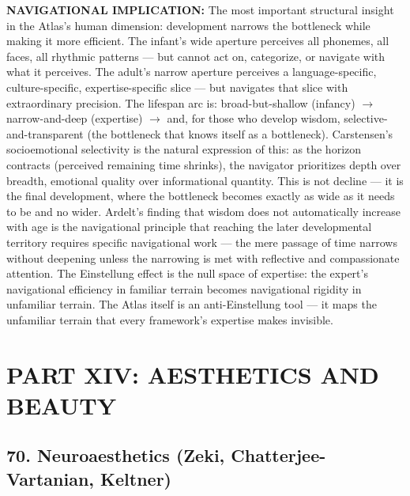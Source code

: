 \textbf{NAVIGATIONAL IMPLICATION:} The most important structural insight in the Atlas's human dimension: development narrows the bottleneck while making it more efficient. The infant's wide aperture perceives all phonemes, all faces, all rhythmic patterns — but cannot act on, categorize, or navigate with what it perceives. The adult's narrow aperture perceives a language-specific, culture-specific, expertise-specific slice — but navigates that slice with extraordinary precision. The lifespan arc is: broad-but-shallow (infancy) $\rightarrow$ narrow-and-deep (expertise) $\rightarrow$ and, for those who develop wisdom, selective-and-transparent (the bottleneck that knows itself as a bottleneck). Carstensen's socioemotional selectivity is the natural expression of this: as the horizon contracts (perceived remaining time shrinks), the navigator prioritizes depth over breadth, emotional quality over informational quantity. This is not decline — it is the final development, where the bottleneck becomes exactly as wide as it needs to be and no wider. Ardelt's finding that wisdom does not automatically increase with age is the navigational principle that reaching the later developmental territory requires specific navigational work — the mere passage of time narrows without deepening unless the narrowing is met with reflective and compassionate attention. The Einstellung effect is the null space of expertise: the expert's navigational efficiency in familiar terrain becomes navigational rigidity in unfamiliar terrain. The Atlas itself is an anti-Einstellung tool — it maps the unfamiliar terrain that every framework's expertise makes invisible.


\bigskip\noindent\makebox[\textwidth]{\color{rulegray}\rule{5cm}{0.3pt}}\bigskip


\chapter*{PART XIV: AESTHETICS AND BEAUTY}


\section*{70. Neuroaesthetics (Zeki, Chatterjee-Vartanian, Keltner)}


